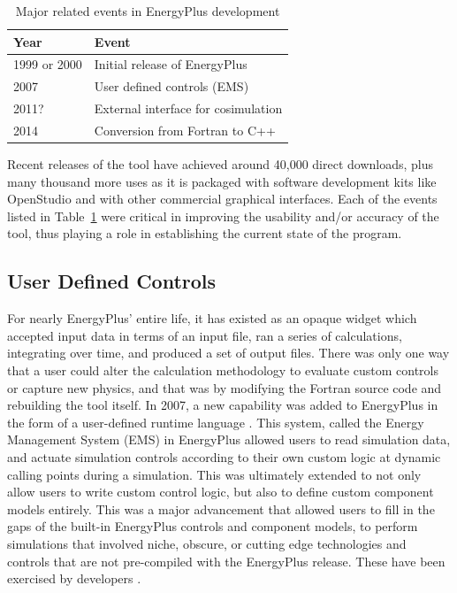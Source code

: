 \documentclass[5p, authoryear]{elsarticle}
\begin{document}
\begin{table}[h!]
\begin{center}
\caption{Major related events in EnergyPlus development}
\begin{tabular}{@{}ll@{}}
\toprule
Year         & Event                               \\ 
\midrule
1999 or 2000 & Initial release of EnergyPlus       \\
2007         & User defined controls (EMS)         \\
2011?        & External interface for cosimulation \\
2014         & Conversion from Fortran to C++      \\ 
\bottomrule
\end{tabular}
\label{table:background:events}
\end{center}
\end{table}

Recent releases of the tool have achieved around 40,000 direct downloads, plus many thousand more uses as it is packaged with software development kits like OpenStudio and with other commercial graphical interfaces.  
Each of the events listed in Table~\ref{table:background:events} were critical in improving the usability and/or accuracy of the tool, thus playing a role in establishing the current state of the program.  

\subsection{User Defined Controls}
  
For nearly EnergyPlus' entire life, it has existed as an opaque widget which accepted input data in terms of an input file, ran a series of calculations, integrating over time, and produced a set of output files.  
There was only one way that a user could alter the calculation methodology to evaluate custom controls or capture new physics, and that was by modifying the Fortran source code and rebuilding the tool itself.  
In 2007, a new capability was added to EnergyPlus in the form of a user-defined runtime language \citep{Ellis2007}.  
This system, called the Energy Management System (EMS) in EnergyPlus allowed users to read simulation data, and actuate simulation controls according to their own custom logic at dynamic calling points during a simulation.  
This was ultimately extended to not only allow users to write custom control logic, but also to define custom component models entirely.  
This was a major advancement that allowed users to fill in the gaps of the built-in EnergyPlus controls and component models, to perform simulations that involved niche, obscure, or cutting edge technologies and controls that are not pre-compiled with the EnergyPlus release.  
These have been exercised by developers \citep{Dutton2012, Jones2013, Sardoueinasab2019, Sardoueinasab2020}.  
\end{document}
